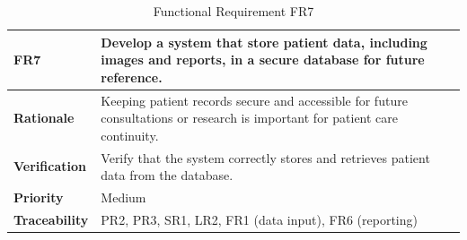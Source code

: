 \documentclass[12pt]{article}
\begin{document}
\begin{table}[h!]
\centering
{}
\begin{tabular}{|p{3.5cm}|p{11.5cm}|}
\hline
\rowcolor{gray!30}
\textbf{FR7} & Develop a system that store patient data, including images and reports, in a secure database for future reference. \\
\hline
\textbf{Rationale} & Keeping patient records secure and accessible for future consultations or research is important for patient care continuity. \\
\hline
\textbf{Verification} & Verify that the system correctly stores and retrieves patient data from the database. \\
\hline
\textbf{Priority} & Medium \\
\hline
\textbf{Traceability} & PR2, PR3, SR1, LR2, FR1 (data input), FR6 (reporting) \\
\hline
\end{tabular}
\caption{Functional Requirement FR7}
\end{table}
\end{document}
